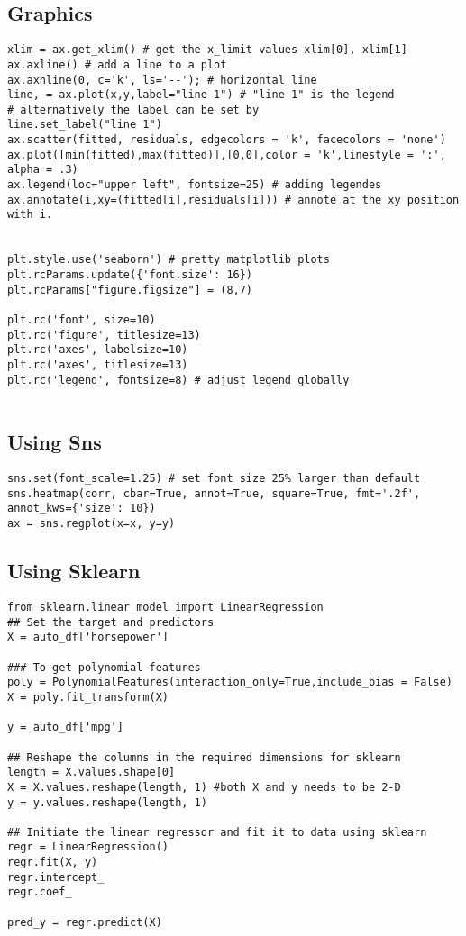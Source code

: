 \documentclass[
  letterpaper,
  DIV=11,
  numbers=noendperiod]{scrreprt}
\begin{document}
\subsection{Graphics}\label{graphics-1}

\begin{verbatim}
xlim = ax.get_xlim() # get the x_limit values xlim[0], xlim[1]
ax.axline() # add a line to a plot
ax.axhline(0, c='k', ls='--'); # horizontal line
line, = ax.plot(x,y,label="line 1") # "line 1" is the legend
# alternatively the label can be set by 
line.set_label("line 1")
ax.scatter(fitted, residuals, edgecolors = 'k', facecolors = 'none')
ax.plot([min(fitted),max(fitted)],[0,0],color = 'k',linestyle = ':', alpha = .3)
ax.legend(loc="upper left", fontsize=25) # adding legendes
ax.annotate(i,xy=(fitted[i],residuals[i])) # annote at the xy position with i. 


plt.style.use('seaborn') # pretty matplotlib plots
plt.rcParams.update({'font.size': 16})
plt.rcParams["figure.figsize"] = (8,7)

plt.rc('font', size=10)
plt.rc('figure', titlesize=13)
plt.rc('axes', labelsize=10)
plt.rc('axes', titlesize=13)
plt.rc('legend', fontsize=8) # adjust legend globally
    
\end{verbatim}

\subsection{Using Sns}\label{using-sns}

\begin{verbatim}
sns.set(font_scale=1.25) # set font size 25% larger than default
sns.heatmap(corr, cbar=True, annot=True, square=True, fmt='.2f', annot_kws={'size': 10})
ax = sns.regplot(x=x, y=y)
\end{verbatim}

\subsection{Using Sklearn}\label{using-sklearn}

\begin{verbatim}
from sklearn.linear_model import LinearRegression
## Set the target and predictors
X = auto_df['horsepower']

### To get polynomial features
poly = PolynomialFeatures(interaction_only=True,include_bias = False)
X = poly.fit_transform(X)

y = auto_df['mpg']

## Reshape the columns in the required dimensions for sklearn
length = X.values.shape[0]
X = X.values.reshape(length, 1) #both X and y needs to be 2-D
y = y.values.reshape(length, 1)

## Initiate the linear regressor and fit it to data using sklearn
regr = LinearRegression()
regr.fit(X, y)
regr.intercept_
regr.coef_

pred_y = regr.predict(X)
\end{verbatim}
\end{document}

